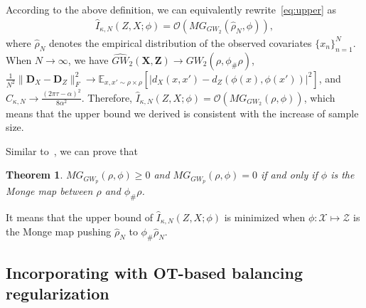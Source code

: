 \documentclass{article}
\newtheorem{theorem}{Theorem}
\begin{document}
According to the above definition, we can equivalently rewrite~\eqref{eq:upper} as
\begin{eqnarray}\label{eq:upper2}
    \hat{I}_{\kappa,N}(Z,X;\phi) = \mathcal{O}(MG_{GW_2}(\hat{\rho}_N,\phi)),
\end{eqnarray}
where $\hat{\rho}_{N}$ denotes the empirical distribution of the observed covariates $\{x_n\}_{n=1}^N$.
When $N\rightarrow\infty$, we have $\widehat{GW}_2(\bm{X},\bm{Z})\rightarrow GW_2(\rho,\phi_{\#}\rho)$, $\frac{1}{N^2}\|\bm{D}_{X}-\bm{D}_{Z}\|_F^2\rightarrow \mathbb{E}_{x,x'\sim \rho\times\rho}[|d_X(x,x')-d_Z(\phi(x),\phi(x'))|^2]$, and $C_{\kappa,N}\rightarrow \frac{(2\pi\tau-\alpha)^2}{8\alpha^2}$. 
Therefore, $\hat{I}_{\kappa,N}(Z,X;\phi)=\mathcal{O}(MG_{GW_2}(\rho,\phi))$, which means that the upper bound we derived is consistent with the increase of sample size.


Similar to~\cite{uscidda2023monge}, we can prove that 
\begin{theorem}\label{thm:gmg}
    $MG_{GW_p}(\rho,\phi)\geq 0$ and $MG_{GW_p}(\rho,\phi)=0$ if and only if $\phi$ is the Monge map between $\rho$ and $\phi_{\#}\rho$. 
\end{theorem}
It means that the upper bound of $\hat{I}_{\kappa,N}(Z,X;\phi)$ is minimized when $\phi:\mathcal{X}\mapsto\mathcal{Z}$ is the Monge map pushing $\hat{\rho}_{N}$ to $\phi_{\#}\hat{\rho}_{N}$. 


\subsection{Incorporating with OT-based balancing regularization}
\end{document}
